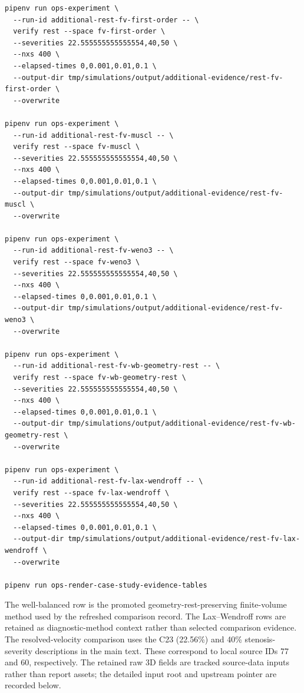 \begin{lstlisting}[basicstyle=\ttfamily\footnotesize,breaklines=true]
pipenv run ops-experiment \
  --run-id additional-rest-fv-first-order -- \
  verify rest --space fv-first-order \
  --severities 22.555555555555554,40,50 \
  --nxs 400 \
  --elapsed-times 0,0.001,0.01,0.1 \
  --output-dir tmp/simulations/output/additional-evidence/rest-fv-first-order \
  --overwrite

pipenv run ops-experiment \
  --run-id additional-rest-fv-muscl -- \
  verify rest --space fv-muscl \
  --severities 22.555555555555554,40,50 \
  --nxs 400 \
  --elapsed-times 0,0.001,0.01,0.1 \
  --output-dir tmp/simulations/output/additional-evidence/rest-fv-muscl \
  --overwrite

pipenv run ops-experiment \
  --run-id additional-rest-fv-weno3 -- \
  verify rest --space fv-weno3 \
  --severities 22.555555555555554,40,50 \
  --nxs 400 \
  --elapsed-times 0,0.001,0.01,0.1 \
  --output-dir tmp/simulations/output/additional-evidence/rest-fv-weno3 \
  --overwrite

pipenv run ops-experiment \
  --run-id additional-rest-fv-wb-geometry-rest -- \
  verify rest --space fv-wb-geometry-rest \
  --severities 22.555555555555554,40,50 \
  --nxs 400 \
  --elapsed-times 0,0.001,0.01,0.1 \
  --output-dir tmp/simulations/output/additional-evidence/rest-fv-wb-geometry-rest \
  --overwrite

pipenv run ops-experiment \
  --run-id additional-rest-fv-lax-wendroff -- \
  verify rest --space fv-lax-wendroff \
  --severities 22.555555555555554,40,50 \
  --nxs 400 \
  --elapsed-times 0,0.001,0.01,0.1 \
  --output-dir tmp/simulations/output/additional-evidence/rest-fv-lax-wendroff \
  --overwrite

pipenv run ops-render-case-study-evidence-tables
\end{lstlisting}
The well-balanced row is the promoted geometry-rest-preserving finite-volume
method used by the refreshed comparison record. The Lax--Wendroff rows are
retained as diagnostic-method context rather than selected comparison evidence.
The resolved-velocity comparison uses the C23 (22.56\%) and 40\% stenosis-severity
descriptions in the main text. These correspond to local source IDs 77 and 60,
respectively. The retained raw 3D fields are tracked source-data inputs rather
than report assets; the detailed input root and upstream pointer are recorded
below.

